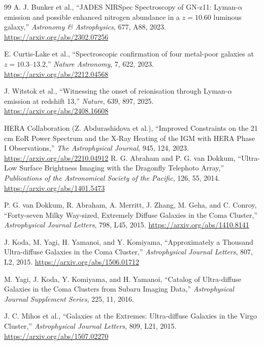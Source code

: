 \begin{thebibliography}{99}
A. J. Bunker et al.,
``JADES NIRSpec Spectroscopy of GN-z11: Lyman-$\alpha$ emission and possible enhanced nitrogen abundance in a $z=10.60$ luminous galaxy,''
\emph{Astronomy \& Astrophysics}, 677, A88, 2023.
\url{https://arxiv.org/abs/2302.07256}

E. Curtis-Lake et al.,
``Spectroscopic confirmation of four metal-poor galaxies at $z=10.3$--$13.2$,''
\emph{Nature Astronomy}, 7, 622, 2023.
\url{https://arxiv.org/abs/2212.04568}

J. Witstok et al.,
``Witnessing the onset of reionisation through Lyman-$\alpha$ emission at redshift 13,''
\emph{Nature}, 639, 897, 2025.
\url{https://arxiv.org/abs/2408.16608}

HERA Collaboration (Z. Abdurashidova et al.),
``Improved Constraints on the 21 cm EoR Power Spectrum and the X-Ray Heating of the IGM with HERA Phase I Observations,''
\emph{The Astrophysical Journal}, 945, 124, 2023.
\url{https://arxiv.org/abs/2210.04912}
R. G. Abraham and P. G. van Dokkum,
``Ultra-Low Surface Brightness Imaging with the Dragonfly Telephoto Array,''
\emph{Publications of the Astronomical Society of the Pacific}, 126, 55, 2014.
\url{https://arxiv.org/abs/1401.5473}

P. G. van Dokkum, R. Abraham, A. Merritt, J. Zhang, M. Geha, and C. Conroy,
``Forty-seven Milky Way-sized, Extremely Diffuse Galaxies in the Coma Cluster,''
\emph{Astrophysical Journal Letters}, 798, L45, 2015.
\url{https://arxiv.org/abs/1410.8141}

J. Koda, M. Yagi, H. Yamanoi, and Y. Komiyama,
``Approximately a Thousand Ultra-diffuse Galaxies in the Coma Cluster,''
\emph{Astrophysical Journal Letters}, 807, L2, 2015.
\url{https://arxiv.org/abs/1506.01712}

M. Yagi, J. Koda, Y. Komiyama, and H. Yamanoi,
``Catalog of Ultra-diffuse Galaxies in the Coma Clusters from Subaru Imaging Data,''
\emph{Astrophysical Journal Supplement Series}, 225, 11, 2016.

J. C. Mihos et al.,
``Galaxies at the Extremes: Ultra-diffuse Galaxies in the Virgo Cluster,''
\emph{Astrophysical Journal Letters}, 809, L21, 2015.
\url{https://arxiv.org/abs/1507.02270}


\end{thebibliography}
